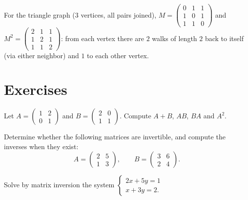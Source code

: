 \begin{example}
For the triangle graph ($3$ vertices, all pairs joined),
$M = \begin{pmatrix} 0&1&1\\ 1&0&1\\ 1&1&0\end{pmatrix}$ and
$M^2 = \begin{pmatrix} 2&1&1\\ 1&2&1\\ 1&1&2\end{pmatrix}$: from each vertex
there are $2$ walks of length $2$ back to itself (via either neighbor) and
$1$ to each other vertex.
\end{example}

\section{Exercises}

\begin{exercise}[$\star$]\label{exo:tle:matrix:1}
Let $A = \begin{pmatrix} 1 & 2\\ 0 & 1 \end{pmatrix}$ and
$B = \begin{pmatrix} 2 & 0\\ 1 & 1 \end{pmatrix}$. Compute $A + B$, $AB$,
$BA$ and $A^2$.
\end{exercise}

\begin{exercise}[$\star$]\label{exo:tle:matrix:2}
Determine whether the following matrices are invertible, and compute the
inverses when they exist:
\[
A = \begin{pmatrix} 2 & 5\\ 1 & 3\end{pmatrix}, \qquad
B = \begin{pmatrix} 3 & 6\\ 2 & 4\end{pmatrix}.
\]
\end{exercise}

\begin{exercise}[$\star$]\label{exo:tle:matrix:3}
Solve by matrix inversion the system
$\begin{cases} 2x + 5y = 1\\ x + 3y = 2 . \end{cases}$
\end{exercise}

